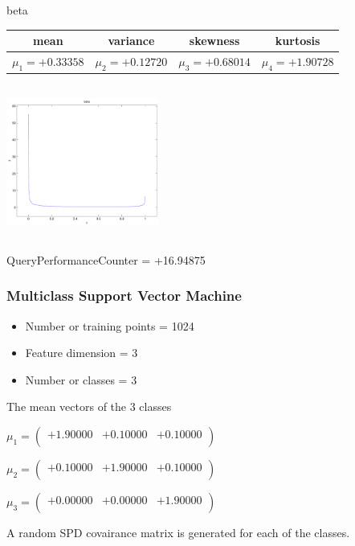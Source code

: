 \documentclass[9pt]{article}
\theoremstyle{plain}
\theoremstyle{definition}
\theoremstyle{remark}
\numberwithin{equation}{section}
\begin{document}
\newpage
beta \begin{tabular}{|c|c|c|c|}  mean & variance & skewness & kurtosis \\  \hline
$\mu_1 = +0.33358$ & $\mu_2 = +0.12720$ & $\mu_3 = +0.68014$ & $\mu_4 =+1.90728$ \\
\end{tabular}

\includegraphics[width=5cm,height=5cm]{beta.pdf}

QueryPerformanceCounter  =  +16.94875
\subsubsection{Multiclass Support Vector Machine }
\begin{itemize}
\item Number or training points = 1024
\item Feature dimension = 3
\item Number or classes = 3
\end{itemize}
{The mean vectors of the 3 classes}

$\mu_1 = \left(
\begin{array}{
ccc}
+1.90000 & +0.10000 & +0.10000 \\
\end{array}
\right)$ \newline 

$\mu_2 = \left(
\begin{array}{
ccc}
+0.10000 & +1.90000 & +0.10000 \\
\end{array}
\right)$ \newline 

$\mu_3 = \left(
\begin{array}{
ccc}
+0.00000 & +0.00000 & +1.90000 \\
\end{array}
\right)$ \newline 

A random SPD covairance matrix is generated for each of the classes.\newline
\end{document}
